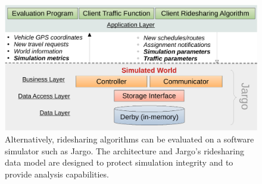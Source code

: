 \begin{figure}[h]
\centering
\includegraphics[width=120mm]{fig/architecture}
\caption{Alternatively, ridesharing algorithms can be evaluated on a software
simulator such as Jargo. The architecture and Jargo's ridesharing data model
are designed to protect simulation integrity and to provide analysis
capabilities.}
\label{fig:architecture}
\end{figure}


